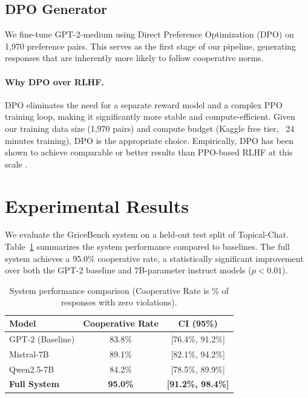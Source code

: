 \documentclass[11pt]{article}
\begin{document}
\subsection{DPO Generator}
We fine-tune GPT-2-medium using Direct Preference Optimization (DPO) \citep{rafailov2023direct} on 1,970 preference pairs. This serves as the first stage of our pipeline, generating responses that are inherently more likely to follow cooperative norms.

\paragraph{Why DPO over RLHF.}
DPO eliminates the need for a separate reward model
and a complex PPO training loop, making it significantly more stable and
compute-efficient. Given our training data size (1,970 pairs) and compute
budget (Kaggle free tier, ~24 minutes training), DPO is the appropriate choice.
Empirically, DPO has been shown to achieve comparable or better results than
PPO-based RLHF at this scale \cite{rafailov2023direct, ouyang2022training}.

\section{Experimental Results}
\label{sec:results}

We evaluate the GriceBench system on a held-out test split of Topical-Chat. Table~\ref{tab:results} summarizes the system performance compared to baselines. The full system achieves a 95.0\% cooperative rate, a statistically significant improvement over both the GPT-2 baseline and 7B-parameter instruct models ($p < 0.01$).

\begin{table}[t]
\centering
\caption{System performance comparison (Cooperative Rate is \% of responses with zero violations).}
\label{tab:results}
\begin{tabular}{lcc}
\toprule
\textbf{Model} & \textbf{Cooperative Rate} & \textbf{CI (95\%)} \\
\midrule
GPT-2 (Baseline) & 83.8\% & [76.4\%, 91.2\%] \\
Mistral-7B & 89.1\% & [82.1\%, 94.2\%] \\
Qwen2.5-7B & 84.2\% & [78.5\%, 89.9\%] \\
\midrule
\textbf{Full System} & \textbf{95.0\%} & \textbf{[91.2\%, 98.4\%]} \\
\bottomrule
\end{tabular}
\end{table}
\end{document}
